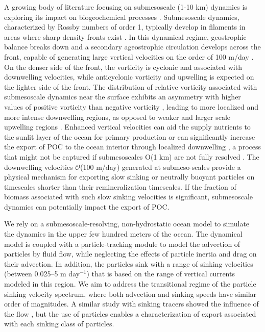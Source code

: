 \documentclass[article,linenumbers]{agujournal2019}
\begin{document}
	A growing body of literature focusing on submesoscale (1-10 km) dynamics is exploring its impact on biogeochemical processes \cite{Levy_2012, Mahadevan_2016}. Submesoscale dynamics, characterized by Rossby numbers of order 1, typically develop in filaments in areas where sharp density fronts exist \cite{Thomas_2013b,Klein_2009,McWilliams_2016}. In this dynamical regime, geostrophic balance breaks down and a secondary ageostrophic circulation develops across the front, capable of generating large vertical velocities on the order of 100 m/day \cite{FoxKemper_2008,Mahadevan_2016}. On the denser side of the front, the vorticity is cyclonic and associated with downwelling velocities, while anticyclonic vorticity and upwelling is expected on the lighter side of the front. The distribution of relative vorticity associated with submesoscale dynamics near the surface exhibits an asymmetry with higher values of positive vorticity than negative vorticity \cite{Rudnick_2001}, leading to more localized and more intense downwelling regions, as opposed to weaker and larger scale upwelling regions \cite{Mahadevan_2006}. Enhanced vertical velocities can aid the supply nutrients to the sunlit layer of the ocean for primary production \cite{Mahadevan_2000,Levy_2001} or can significantly increase the export of POC to the ocean interior through localized downwelling \cite{Levy_2012, Gruber_2011,Estapa_2015,Omand_2015}, a process that might not be captured if submesoscales O(1 km) are not fully resolved \cite{Resplandy_2019}. The downwelling velocities $\mathcal{O}$(100 m/day) generated at submeso-scales provide a physical mechanism for exporting slow sinking or neutrally buoyant particles on timescales shorter than their remineralization timescales. If the fraction of  biomass associated with such slow sinking velocities is significant, submesoscale dynamics can potentially impact the export of POC.

	We rely on a submesoscale-resolving, non-hydrostatic  ocean model to simulate the dynamics in the upper few hundred meters of the ocean. The dynamical model is coupled with a particle-tracking module to model the advection of particles by fluid flow, while neglecting the effects of particle inertia and drag on their advection. In addition, the particles sink with a range of sinking velocities (between 0.025--5 m day$^{-1}$) that is based on the range of vertical currents modeled in this region. We aim to address the transitional regime of the particle sinking velocity spectrum, where both advection and sinking speeds have similar order of magnitudes. A similar study with sinking tracers showed the influence of the flow \cite{Taylor_2020}, but the use of particles enables a characterization of export associated with each sinking class of particles.
\end{document}
